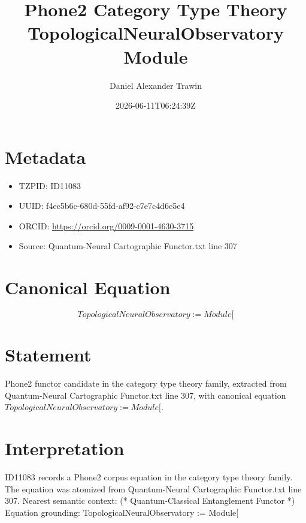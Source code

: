 \documentclass[11pt]{article}
\title{Phone2 Category Type Theory TopologicalNeuralObservatory Module}
\author{Daniel Alexander Trawin}
\date{2026-06-11T06:24:39Z}
\begin{document}
\maketitle
\section*{Metadata}
\begin{itemize}
\item TZPID: ID11083
\item UUID: f4ec5b6c-680d-55fd-af92-c7e7c4d6e5e4
\item ORCID: \url{https://orcid.org/0009-0001-4630-3715}
\item Source: Quantum-Neural Cartographic Functor.txt line 307
\end{itemize}
\section*{Canonical Equation}
\[
TopologicalNeuralObservatory := Module[
\]
\section*{Statement}
Phone2 functor candidate in the category type theory family, extracted from Quantum-Neural Cartographic Functor.txt line 307, with canonical equation $TopologicalNeuralObservatory := Module[$.
\section*{Interpretation}
ID11083 records a Phone2 corpus equation in the category type theory family. The equation was atomized from Quantum-Neural Cartographic Functor.txt line 307. Nearest semantic context: (* Quantum-Classical Entanglement Functor *) Equation grounding: TopologicalNeuralObservatory := Module[
\end{document}
